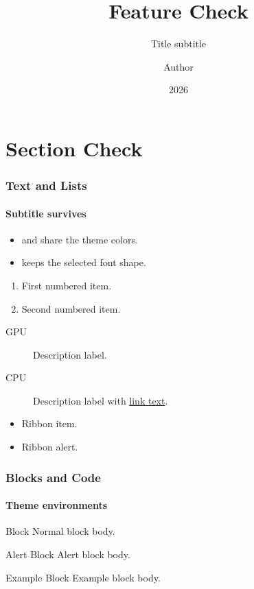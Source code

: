 \documentclass[notheorems,aspectratio=169]{beamer}
\title{Feature Check}
\subtitle{Title subtitle}
\author{Author}
\institute{Institute}
\date{2026}
\begin{document}
\makeatletter
\begingroup{}\endgroup
\makeatother

\maketitle

\section{Section Check}

\begin{frame}
  \frametitle{Text and Lists}
  \framesubtitle{Subtitle survives}

  \begin{itemize}
    \item {} and  share the theme colors.
    \item {} keeps the selected font shape.
  \end{itemize}

  \begin{enumerate}
    \item First numbered item.
    \item Second numbered item.
  \end{enumerate}

  \begin{description}
    \item[GPU] Description label.
    \item[CPU] Description label with \href{https://example.org}{link text}.
  \end{description}

  \begin{ribbon}
    \begin{itemize}
      \item Ribbon item.
      \item \alert{Ribbon alert}.
    \end{itemize}
  \end{ribbon}
\end{frame}

\begin{frame}
  \frametitle{Blocks and Code}
  \framesubtitle{Theme environments}

  \begin{block}{Block}
    Normal block body.
  \end{block}

  \begin{alertblock}{Alert Block}
    Alert block body.
  \end{alertblock}

  \begin{exampleblock}{Example Block}
    Example block body.
  \end{exampleblock}
\end{frame}
\end{document}
